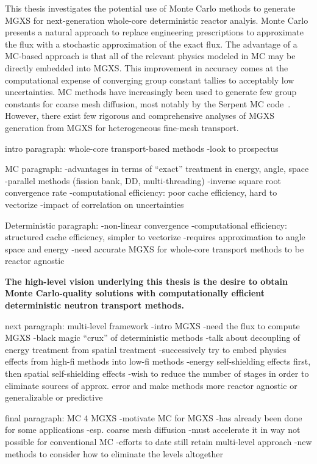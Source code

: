 This thesis investigates the potential use of Monte Carlo methods to generate \ac{MGXS} for next-generation whole-core deterministic reactor analyis. Monte Carlo presents a natural approach to replace engineering prescriptions to approximate the flux with a stochastic approximation of the exact flux. The advantage of a \ac{MC}-based approach is that all of the relevant physics modeled in \ac{MC} may be directly embedded into \ac{MGXS}. This improvement in accuracy comes at the computational expense of converging group constant tallies to acceptably low uncertainties. \ac{MC} methods have increasingly been used to generate few group constants for coarse mesh diffusion, most notably by the Serpent \ac{MC} code~\cite{serpent2013manual}. However, there exist few rigorous and comprehensive analyses of \ac{MGXS} generation from \ac{MGXS} for heterogeneous fine-mesh transport.

intro paragraph: whole-core transport-based methods
-look to prospectus

MC paragraph: 
-advantages in terms of ``exact'' treatment in energy, angle, space
-parallel methods (fission bank, DD, multi-threading)
-inverse square root convergence rate
-computational efficiency: poor cache efficiency, hard to vectorize
-impact of correlation on uncertainties

Deterministic paragraph: 
-non-linear convergence
-computational efficiency: structured cache efficiency, simpler to vectorize
-requires approximation to angle space and energy
-need accurate \ac{MGXS} for whole-core transport methods to be reactor agnostic

\begin{emphbox}
\textbf{The high-level vision underlying this thesis is the desire to obtain Monte Carlo-quality solutions with computationally efficient deterministic neutron transport methods.}
\end{emphbox}

next paragraph: multi-level framework
-intro MGXS
-need the flux to compute MGXS
-black magic ``crux'' of deterministic methods
-talk about decoupling of energy treatment from spatial treatment
  -successively try to embed physics effects from high-fi methods into low-fi methods
  -energy self-shielding effects first, then spatial self-shielding effects
-wish to reduce the number of stages in order to eliminate sources of approx. error and make methods more reactor agnostic or generalizable or predictive

final paragraph: MC 4 MGXS
-motivate \ac{MC} for \ac{MGXS}
-has already been done for some applications
  -esp. coarse mesh diffusion
-must accelerate it in way not possible for conventional \ac{MC}
-efforts to date still retain multi-level approach
  -new methods to consider how to eliminate the levels altogether


